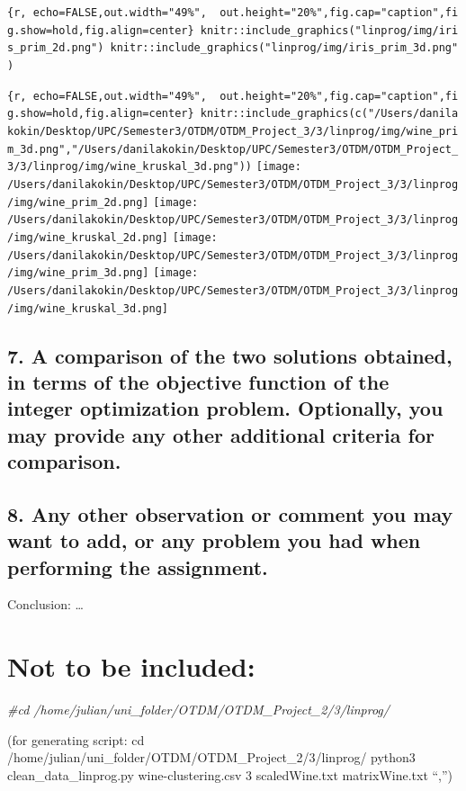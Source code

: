 \documentclass[
]{article}
\newenvironment{Shaded}{\begin{snugshade}}{\end{snugshade}}
\newcommand{\CommentTok}[1]{\textcolor[rgb]{0.56,0.35,0.01}{\textit{#1}}}
\begin{document}
\texttt{\{r,\ echo=FALSE,out.width="49\%",\ \ out.height="20\%",fig.cap="caption",fig.show=\textquotesingle{}hold\textquotesingle{},fig.align=\textquotesingle{}center\textquotesingle{}\}\ knitr::include\_graphics("linprog/img/iris\_prim\_2d.png")\ knitr::include\_graphics("linprog/img/iris\_prim\_3d.png")}

\texttt{\{r,\ echo=FALSE,out.width="49\%",\ \ out.height="20\%",fig.cap="caption",fig.show=\textquotesingle{}hold\textquotesingle{},fig.align=\textquotesingle{}center\textquotesingle{}\}\ knitr::include\_graphics(c("/Users/danilakokin/Desktop/UPC/Semester3/OTDM/OTDM\_Project\_3/3/linprog/img/wine\_prim\_3d.png","/Users/danilakokin/Desktop/UPC/Semester3/OTDM/OTDM\_Project\_3/3/linprog/img/wine\_kruskal\_3d.png"))}
\texttt{[image: /Users/danilakokin/Desktop/UPC/Semester3/OTDM/OTDM\_Project\_3/3/linprog/img/wine\_prim\_2d.png]}
\texttt{[image: /Users/danilakokin/Desktop/UPC/Semester3/OTDM/OTDM\_Project\_3/3/linprog/img/wine\_kruskal\_2d.png]}
\texttt{[image: /Users/danilakokin/Desktop/UPC/Semester3/OTDM/OTDM\_Project\_3/3/linprog/img/wine\_prim\_3d.png]}
\texttt{[image: /Users/danilakokin/Desktop/UPC/Semester3/OTDM/OTDM\_Project\_3/3/linprog/img/wine\_kruskal\_3d.png]}

\subsection{7. A comparison of the two solutions obtained, in terms of
the objective function of the integer optimization problem. Optionally,
you may provide any other additional criteria for
comparison.}\label{a-comparison-of-the-two-solutions-obtained-in-terms-of-the-objective-function-of-the-integer-optimization-problem.-optionally-you-may-provide-any-other-additional-criteria-for-comparison.}

\subsection{8. Any other observation or comment you may want to add, or
any problem you had when performing the
assignment.}\label{any-other-observation-or-comment-you-may-want-to-add-or-any-problem-you-had-when-performing-the-assignment.}

Conclusion: \ldots{}

\section{Not to be included:}\label{not-to-be-included}

\begin{Shaded}
\begin{Highlighting}[]
\CommentTok{\#cd /home/julian/uni\_folder/OTDM/OTDM\_Project\_2/3/linprog/}
\end{Highlighting}
\end{Shaded}

(for generating script: cd
/home/julian/uni\_folder/OTDM/OTDM\_Project\_2/3/linprog/ python3
clean\_data\_linprog.py wine-clustering.csv 3 scaledWine.txt
matrixWine.txt ``,'')
\end{document}
